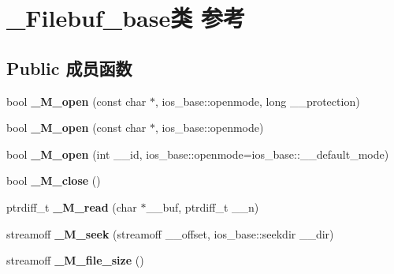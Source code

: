 \hypertarget{class___filebuf__base}{}\section{\+\_\+\+Filebuf\+\_\+base类 参考}
\label{class___filebuf__base}
\subsection*{Public 成员函数}
\begin{DoxyCompactItemize}
\item 
\mbox{\label{class___filebuf__base_ae54ef0a338795da052c9e22e6e898c6b}} 
bool {\bfseries \+\_\+\+M\+\_\+open} (const char $\ast$, ios\+\_\+base\+::openmode, long \+\_\+\+\_\+protection)
\item 
\mbox{\label{class___filebuf__base_a1e058b575c86e2dbb57be63b3a26fc96}} 
bool {\bfseries \+\_\+\+M\+\_\+open} (const char $\ast$, ios\+\_\+base\+::openmode)
\item 
\mbox{\label{class___filebuf__base_a7e3f7b41a3c1f24cdae7d6b00d160917}} 
bool {\bfseries \+\_\+\+M\+\_\+open} (int \+\_\+\+\_\+id, ios\+\_\+base\+::openmode=ios\+\_\+base\+::\+\_\+\+\_\+default\+\_\+mode)
\item 
\mbox{\label{class___filebuf__base_ab8981c76fcc896df230d501bad1493be}} 
bool {\bfseries \+\_\+\+M\+\_\+close} ()
\item 
\mbox{\label{class___filebuf__base_afe0af3bc4369192c1b7a333d9e6eb43d}} 
ptrdiff\+\_\+t {\bfseries \+\_\+\+M\+\_\+read} (char $\ast$\+\_\+\+\_\+buf, ptrdiff\+\_\+t \+\_\+\+\_\+n)
\item 
\mbox{\label{class___filebuf__base_a94601b30133f75e072b71d0b7e59dfdd}} 
streamoff {\bfseries \+\_\+\+M\+\_\+seek} (streamoff \+\_\+\+\_\+offset, ios\+\_\+base\+::seekdir \+\_\+\+\_\+dir)
\item 
\mbox{\label{class___filebuf__base_a15c1c54813bacf7380836b018dc0f623}} 
streamoff {\bfseries \+\_\+\+M\+\_\+file\+\_\+size} ()
\item 
\mbox{\label{class___filebuf__base_a1547b4dedfbbcd42954b0ad845290d57}} 

\end{DoxyCompactItemize}
